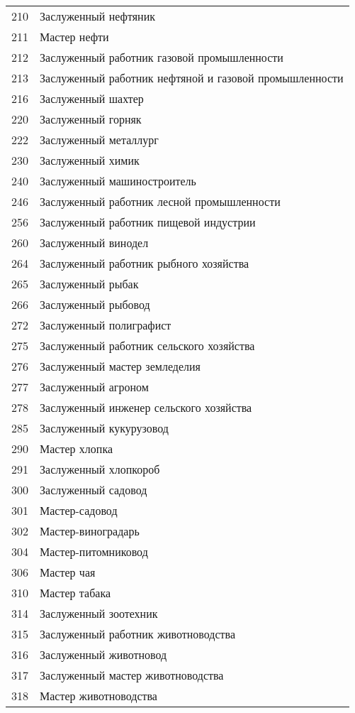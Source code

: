 \documentclass[10pt, a4paper, titlepage]{article}
\begin{document}
\begin{xtabular}{rp{.38\textwidth}}
    210 & Заслуженный нефтяник \\
    211 & Мастер нефти \\
    212 & Заслуженный работник газовой промышленности \\
    213 & Заслуженный работник нефтяной и газовой промышленности \\
    216 & Заслуженный шахтер \\
    220 & Заслуженный горняк \\
    222 & Заслуженный металлург \\
    230 & Заслуженный химик \\
    240 & Заслуженный машиностроитель \\
    246 & Заслуженный работник лесной промышленности \\
    256 & Заслуженный работник пищевой индустрии \\
    260 & Заслуженный винодел \\
    264 & Заслуженный работник рыбного хозяйства \\
    265 & Заслуженный рыбак \\
    266 & Заслуженный рыбовод \\
    272 & Заслуженный полиграфист \\
    275 & Заслуженный работник сельского хозяйства \\
    276 & Заслуженный мастер земледелия \\
    277 & Заслуженный агроном \\
    278 & Заслуженный инженер сельского хозяйства \\
    285 & Заслуженный кукурузовод \\
    290 & Мастер хлопка \\
    291 & Заслуженный хлопкороб \\
    300 & Заслуженный садовод \\
    301 & Мастер-садовод \\
    302 & Мастер-виноградарь \\
    304 & Мастер-питомниковод \\
    306 & Мастер чая \\
    310 & Мастер табака \\
    314 & Заслуженный зоотехник \\
    315 & Заслуженный работник животноводства \\
    316 & Заслуженный животновод \\
    317 & Заслуженный мастер животноводства \\
    318 & Мастер животноводства \\

\end{xtabular}
\end{document}
